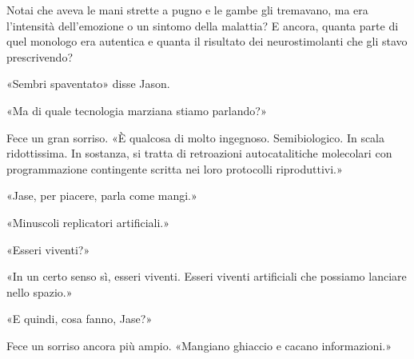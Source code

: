 Notai che aveva le mani strette a pugno e le gambe gli tremavano, ma era
l'intensità dell'emozione o un sintomo della malattia? E ancora, quanta
parte di quel monologo era autentica e quanta il risultato dei
neurostimolanti che gli stavo prescrivendo?

«Sembri spaventato» disse Jason.

«Ma di quale tecnologia marziana stiamo parlando?»

Fece un gran sorriso. «È qualcosa di molto ingegnoso. Semibiologico. In
scala ridottissima. In sostanza, si tratta di retroazioni
autocatalitiche molecolari con programmazione contingente scritta nei
loro protocolli riproduttivi.»

«Jase, per piacere, parla come mangi.»

«Minuscoli replicatori artificiali.»

«Esseri viventi?»

«In un certo senso sì, esseri viventi. Esseri viventi artificiali che
possiamo lanciare nello spazio.»

«E quindi, cosa fanno, Jase?»

Fece un sorriso ancora più ampio. «Mangiano ghiaccio e cacano
informazioni.»